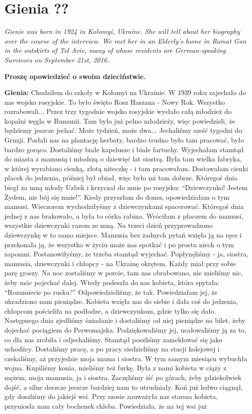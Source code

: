 \section{Gienia ??}

\textit{Gienie was born in 1924 in Kołomyi, Ukraine. She will tell about her biography over the course of the interview. We met her in an Elderly’s home in Ramat Gan in the outskirts of Tel Aviv, many of whose residents are German-speaking Survivors on September 21st, 2016.}\par
\vspace*{2em}
\textbf{Proszę opowiedzieć o swoim dzieciństwie.}

\textbf{Gienia:} Chodziłem do szkoły w Kołomyi na Ukrainie. W 1939 roku zajechało do nas wojsko rosyjskie. To było święto Rosz Haszana - Nowy Rok. Wszystko rozrabowali... Przez trzy tygodnie wojsko rosyjskie wysłało całą młodzież do kopalni węgla w Rumunii. Tam było już pełno młodzieży, więc powiedzieli, że będziemy jeszcze jechać. Może tydzień, może dwa... Jechaliśmy sześć tygodni do Gruzji. Posłali nas na plantację herbaty, bardzo trudno było tam pracować, było bardzo gorąco. Dostaliśmy białe kapelusze i białe fartuchy. Wyjechałam stamtąd do miasta z mamusią i młodszą o dziewięć lat siostrą. Była tam wielka fabryka, w której wyrabiano cienką, złotą niteczkę - i tam pracowałam. Dostawałam cienki placek do jedzenia, później był obiad, więc było mi tam dobrze. Któregoś dnia biegł za mną młody Uzbek i krzyczał do mnie po rosyjsku: "`Dziewczynko! Jestem Żydem, nie bój się mnie!"'. Kiedy przyszłam do domu, opowiedziałam o tym mamusi. Wieczorem wychodziłyśmy z dziewczynkami spacerować. Któregoś dnia jednej z nas brakowało, a była to córka rabina. Wróciłam z płaczem do mamusi, wszystkie dziewczynki razem ze mną. Na trzeci dzień przyprowadzono dziewczynkę w to samo miejsce. Mamusia bez żadnych pytań wzięła ją na ręce i przekonała ją, że wszystko w życiu może nas spotkać i po prostu niech o tym zapomni. Postanowiłyśmy, że trzeba stamtąd wyjechać. Popłynęliśmy - ja, siostra, mamusia, dziewczynki i chłopcy - na Ukrainę okrętem. Każdy miał przy sobie parę groszy. Na noc zostaliśmy w porcie, tam nas obrabowano, nie mieliśmy nic, żeby móc pojechać dalej. Wtedy podeszła do nas kobieta, która spytała: "`Rozumiecie po rusku?"' Odpowiedzieliśmy, że tak. Powiedziałam jej, że ukradziono nam pieniądze. Kobieta wzięła nas do siebie i dała coś do jedzenia, chłopcom pościeliła na podłodze, a dziewczynkom, gdzie tylko się dało. Następnego dnia zjedliśmy śniadanie i dostaliśmy od niej pieniądze na bilet, żeby dojechać pociągiem do Perwomajska. Podziękowaliśmy jej, ucałowaliśmy ją za to, co dla nas zrobiła i odjechaliśmy. Stamtąd poszliśmy zameldować się jako uchodźcy. Dostaliśmy pracę, a po pracy siedzieliśmy na stacji kolejowej i czekaliśmy, aż przyjedzie moja mama i siostra. W tym samym miesiącu wybuchła wojna. Kupiliśmy konia, mieliśmy też furkę. Była z nami kobieta w ciąży z mężem, moja mamusia, ja i siostra. Zaczęliśmy iść po górach, żeby gdziekolwiek dojść, a silne deszcze jeszcze bardziej nam to utrudniały. Koń już ledwo ciągnął, gdy doszliśmy do jakiejś wsi. Przy szosie zauważyła nas starsza kobieta, przyniosła nam cały bochenek chleba. Powiedziała, że na tej wsi już 